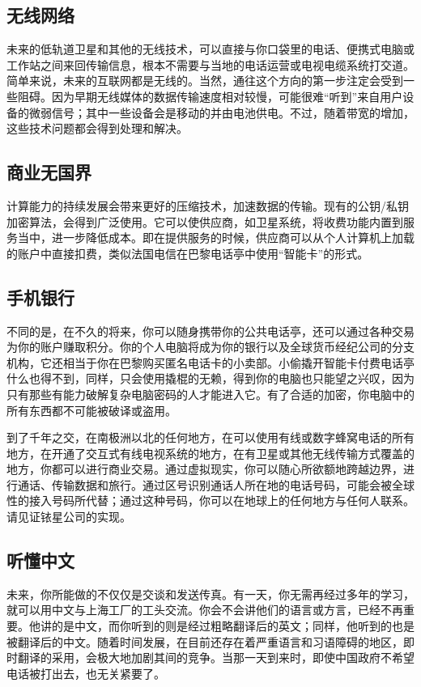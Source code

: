 \subsection{无线网络}
未来的低轨道卫星和其他的无线技术，可以直接与你口袋里的电话、便携式电脑或工作站之间来回传输信息，根本不需要与当地的电话运营或电视电缆系统打交道。简单来说，未来的互联网都是无线的。当然，通往这个方向的第一步注定会受到一些阻碍。因为早期无线媒体的数据传输速度相对较慢，可能很难“听到”来自用户设备的微弱信号；其中一些设备会是移动的并由电池供电。不过，随着带宽的增加，这些技术问题都会得到处理和解决。

\subsection{商业无国界}
计算能力的持续发展会带来更好的压缩技术，加速数据的传输。现有的公钥/私钥加密算法，会得到广泛使用。它可以使供应商，如卫星系统，将收费功能内置到服务当中，进一步降低成本。即在提供服务的时候，供应商可以从个人计算机上加载的账户中直接扣费，类似法国电信在巴黎电话亭中使用“智能卡”的形式。

\subsection{手机银行}
不同的是，在不久的将来，你可以随身携带你的公共电话亭，还可以通过各种交易为你的账户赚取积分。你的个人电脑将成为你的银行以及全球货币经纪公司的分支机构，它还相当于你在巴黎购买匿名电话卡的小卖部。小偷撬开智能卡付费电话亭什么也得不到，同样，只会使用撬棍的无赖，得到你的电脑也只能望之兴叹，因为只有那些有能力破解复杂电脑密码的人才能进入它。有了合适的加密，你电脑中的所有东西都不可能被破译或盗用。

到了千年之交，在南极洲以北的任何地方，在可以使用有线或数字蜂窝电话的所有地方，在开通了交互式有线电视系统的地方，在有卫星或其他无线传输方式覆盖的地方，你都可以进行商业交易。通过虚拟现实，你可以随心所欲额地跨越边界，进行通话、传输数据和旅行。通过区号识别通话人所在地的电话号码，可能会被全球性的接入号码所代替；通过这种号码，你可以在地球上的任何地方与任何人联系。请见证铱星公司的实现。

\subsection{听懂中文}
未来，你所能做的不仅仅是交谈和发送传真。有一天，你无需再经过多年的学习，就可以用中文与上海工厂的工头交流。你会不会讲他们的语言或方言，已经不再重要。他讲的是中文，而你听到的则是经过粗略翻译后的英文；同样，他听到的也是被翻译后的中文。随着时间发展，在目前还存在着严重语言和习语障碍的地区，即时翻译的采用，会极大地加剧其间的竞争。当那一天到来时，即使中国政府不希望电话被打出去，也无关紧要了。

